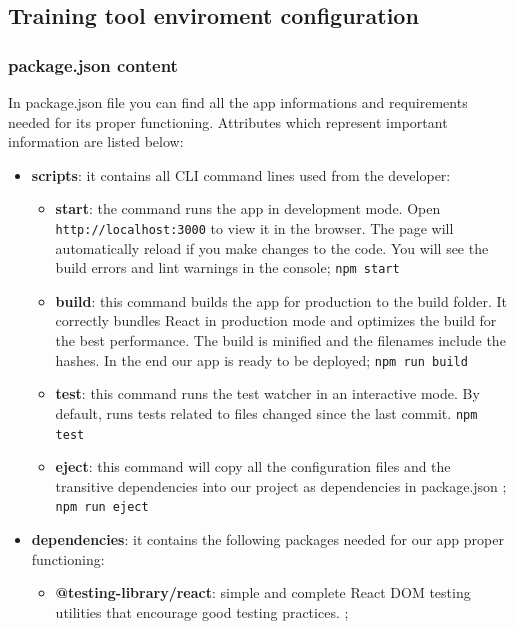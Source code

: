 	\subsection{Training tool enviroment configuration}
	
	
		\subsubsection{package.json content}
In package.json file you can find all the app informations and requirements needed for its proper functioning. Attributes which represent important information are listed below:
		\begin{itemize}
			\item\textbf{scripts}: it contains all CLI command lines used from the developer: 
				\begin{itemize}
				\item\textbf{start}: the command runs the app in development mode. Open \texttt{http://localhost:3000} to view it in the browser. The page will automatically reload if you make changes to the code. You will see the build errors and lint warnings in the console;
				\newline\texttt{npm start}
				\item\textbf{build}: this command builds the app for production to the build folder. It correctly bundles React in production mode and optimizes the build for the best performance. The build is minified and the filenames include the hashes. In the end our app is ready to be deployed;
				\newline\texttt{npm run build}
				\item\textbf{test}: this command runs the test watcher in an interactive mode. By default, runs tests related to files changed since the last commit.
				\newline\texttt{npm test}
				\item\textbf{eject}: this command will copy all the configuration files and the transitive dependencies into our project as dependencies in package.json ;
				\newline\texttt{npm run eject}
			\end{itemize}
			\item\textbf{dependencies}: it contains the following packages needed for our app proper functioning:
			\begin{itemize}
				\item\textbf{@testing-library/react}: simple and complete React DOM testing utilities that encourage good testing practices. ;

\end{itemize}
\end{itemize}
